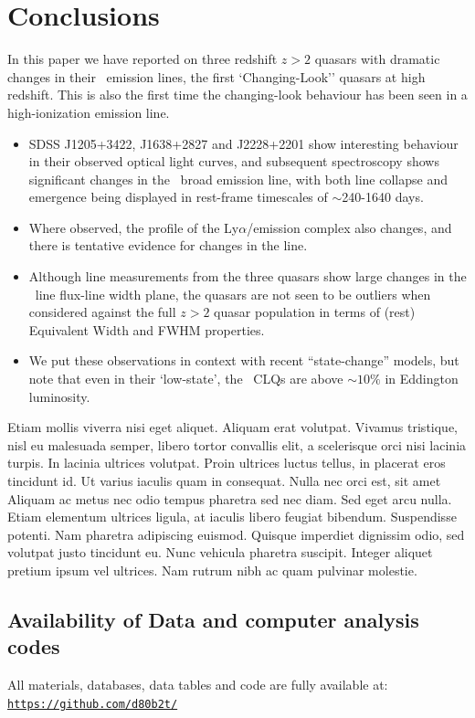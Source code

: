 \documentclass[a4paper,fleqn,usenatbib]{mnras}
\begin{document}
\section{Conclusions}
In this paper we have reported on three redshift $z>2$ quasars with
dramatic changes in their \civ\ emission lines, the first
`Changing-Look'' quasars at high redshift.  This is also the first
time the changing-look behaviour has been seen in a high-ionization
emission line.

\begin{itemize}
  \item SDSS J1205+3422, J1638+2827 and J2228+2201 show interesting behaviour
in their observed optical light curves, and subsequent spectroscopy
shows significant changes in the \civ\ broad emission line, with both
line collapse and emergence being displayed in rest-frame timescales
of $\sim$240-1640 days.
\item Where observed, the profile of the Ly$\alpha$/\nv emission complex
also changes, and there is tentative evidence for changes in the \mgii
line.
\item Although line measurements from the three quasars show large changes
in the \civ\ line flux-line width plane, the quasars are not seen to
be outliers when considered against the full $z>2$ quasar population
in terms of (rest) Equivalent Width and FWHM properties.
\item 
We put these observations in context with recent ``state-change''
models, but note that even in their `low-state', the \civ\ CLQs are
above $\sim10\%$ in Eddington luminosity.
\end{itemize}

Etiam mollis viverra nisi eget aliquet. Aliquam erat volutpat. Vivamus
tristique, nisl eu malesuada semper, libero tortor convallis elit, a
scelerisque orci nisi lacinia turpis. In lacinia ultrices
volutpat. Proin ultrices luctus tellus, in placerat eros tincidunt
id. Ut varius iaculis quam in consequat. Nulla nec orci est, sit amet
Aliquam ac metus nec odio tempus pharetra sed nec diam. Sed eget arcu
nulla. Etiam elementum ultrices ligula, at iaculis libero feugiat
bibendum. Suspendisse potenti. Nam pharetra adipiscing
euismod. Quisque imperdiet dignissim odio, sed volutpat justo
tincidunt eu. Nunc vehicula pharetra suscipit. Integer aliquet pretium
ipsum vel ultrices. Nam rutrum nibh ac quam pulvinar molestie.



\subsection*{Availability of Data and computer analysis codes} 
All materials, databases, data tables and code are fully available at: 
\href{https://github.com/d80b2t/VHzQ}{\tt https://github.com/d80b2t/}
\end{document}
